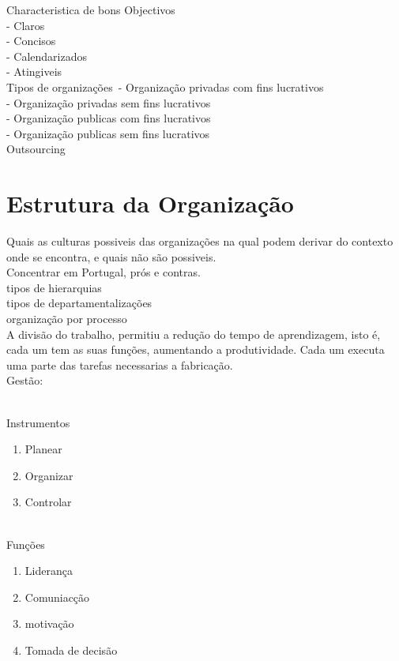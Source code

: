 Characteristica de bons Objectivos\\
- Claros\\
- Concisos\\
- Calendarizados\\
- Atingiveis\\


Tipos de organizações\
- Organização privadas com fins lucrativos\\
- Organização privadas sem fins lucrativos\\
- Organização publicas com fins lucrativos\\
- Organização publicas sem fins lucrativos\\


Outsourcing\\



\section{Estrutura da Organização}
Quais as culturas possiveis das organizações na qual podem derivar do contexto onde se encontra, e quais não são possiveis.\\

Concentrar em Portugal, prós e contras.\\

tipos de hierarquias\\
tipos de departamentalizações\\
organização por processo\\

A divisão do trabalho, permitiu a redução do tempo de aprendizagem, isto é, cada um tem as suas funções, aumentando a produtividade. Cada um executa uma parte das tarefas necessarias a fabricação.\\

\newpage
Gestão:\\ \\
\begin{minipage}{20cm}
\begin{minipage}{5cm}
Instrumentos
\begin{enumerate}
\item Planear
\item Organizar
\item Controlar\\ \\
\end{enumerate}
\end{minipage}
\begin{minipage}{5cm}
Funções
\begin{enumerate}
\item Liderança
\item Comuniacção
\item motivação
\item Tomada de decisão
\end{enumerate}
\end{minipage}
\end{minipage}

